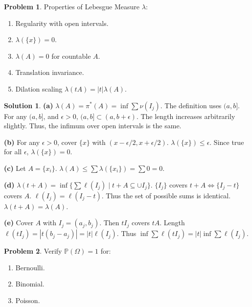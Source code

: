 \documentclass[11pt]{article}
\theoremstyle{definition}
\newtheorem{problem}{Problem}
\newtheorem*{solution}{Solution}
\begin{document}
\hrulefill

\begin{problem}
Properties of Lebesgue Measure $\lambda$:
\begin{enumerate}[label=(\alph*)]
    \item Regularity with open intervals.
    \item $\lambda(\{x\}) = 0$.
    \item $\lambda(A) = 0$ for countable $A$.
    \item Translation invariance.
    \item Dilation scaling $\lambda(tA) = |t|\lambda(A)$.
\end{enumerate}
\end{problem}

\begin{solution}
\textbf{(a)} $\lambda(A) = \pi^*(A) = \inf \sum \nu(I_j)$. The definition uses $(a, b]$. For any $(a, b]$, and $\epsilon > 0$, $(a, b] \subset (a, b+\epsilon)$. The length increases arbitrarily slightly. Thus, the infimum over open intervals is the same.

\textbf{(b)} For any $\epsilon > 0$, cover $\{x\}$ with $(x - \epsilon/2, x + \epsilon/2)$.
$\lambda(\{x\}) \le \epsilon$. Since true for all $\epsilon$, $\lambda(\{x\}) = 0$.

\textbf{(c)} Let $A = \{x_i\}$. $\lambda(A) \le \sum \lambda(\{x_i\}) = \sum 0 = 0$.

\textbf{(d)} $\lambda(t+A) = \inf \{ \sum \ell(I_j) \mid t+A \subseteq \cup I_j \}$.
$\{I_j\}$ covers $t+A \iff \{I_j - t\}$ covers $A$.
$\ell(I_j) = \ell(I_j - t)$.
Thus the set of possible sums is identical. $\lambda(t+A) = \lambda(A)$.

\textbf{(e)} Cover $A$ with $I_j = (a_j, b_j)$. Then $tI_j$ covers $tA$.
Length $\ell(tI_j) = |t(b_j - a_j)| = |t|\ell(I_j)$.
Thus $\inf \sum \ell(tI_j) = |t| \inf \sum \ell(I_j)$.
\end{solution}

\hrulefill

\begin{problem}
Verify $\mathbb{P}(\Omega)=1$ for:
\begin{enumerate}[label=(\alph*)]
    \item Bernoulli.
    \item Binomial.
    \item Poisson.
\end{enumerate}
\end{problem}
\end{document}
